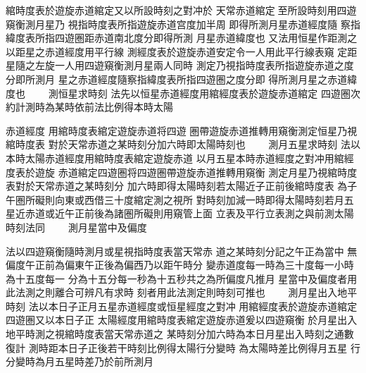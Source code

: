 \begin{正文}
綰時度表於遊旋赤道綰定又以所設時刻之對冲於
天常赤道綰定𠉀至所設時刻用四遊窺衡測月星乃
視指時度表所指遊旋赤道宫度加半周
即得所測月星赤道經度隨
察指緯度表所指四遊圏距赤道南北度分即得所測
月星赤道緯度也
又法用恒星作距測之以距星之赤道經度用平行線
測經度表於遊旋赤道安定令一人用此平行線表窺
定距星隨之左旋一人用四遊窺衡測月星兩人同時
測定乃視指時度表所指遊旋赤道之度分即所測月
星之赤道經度隨察指緯度表所指四遊圏之度分即
得所測月星之赤道緯度也
　　測恒星求時刻
法先以恒星赤道經度用綰經度表於遊旋赤道綰定
四遊圏次約計測時為某時依前法比例得本時太陽
\par
赤道經度
用綰時度表綰定遊旋赤道将四遊
圏帶遊旋赤道推轉用窺衡測定恒星乃視綰時度表
對於天常赤道之某時刻分加六時即太陽時刻也
　　測月五星求時刻
法以本時太陽赤道經度用綰時度表綰定遊旋赤道
以月五星本時赤道經度之對冲用綰經度表於遊旋
赤道綰定四遊圏将四遊圏帶遊旋赤道推轉用窺衡
測定月星乃視綰時度表對於天常赤道之某時刻分
加六時即得太陽時刻若太陽近子正前後綰時度表
為子午圏所礙則向東或西借三十度綰定測之視所
對時刻加減一時即得太陽時刻若月五
星近赤道或近午正前後為諸圏所礙則用窺管上面
立表及平行立表測之與前測太陽時刻法同
　　測月星當中及偏度
\par
法以四遊窺衡隨時測月或星視指時度表當天常赤
道之某時刻分記之午正為當中
無偏度午正前為偏東午正後為偏西乃以距午時分
變赤道度每一時為三十度每一小時為十五度每一
分為十五分每一秒為十五秒共之為所偏度凡推月
星當中及偏度者用此法測之則離合可辨凡有求時
刻者用此法測定則時刻可推也
　　測月星出入地平時刻
法以本日子正月五星赤道經度或恒星經度之對冲
用綰經度表於遊旋赤道綰定四遊圏又以本日子正
太陽經度用綰時度表綰定遊旋赤道爰以四遊窺衡
於月星出入地平時測之視綰時度表當天常赤道之
某時刻分加六時為本日月星出入時刻之通數復計
測時距本日子正後若干時刻比例得太陽行分變時
為太陽時差比例得月五星
行分變時為月五星時差乃於前所測月

\end{正文}
